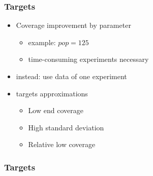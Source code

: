 \begin{frame}
	\frametitle{Targets}
	
	\begin{itemize}
		\item Coverage improvement by parameter
		\begin{itemize}
			\item example: $pop = 125$
			\item time-consuming experiments necessary
		\end{itemize} 
		\item instead: use data of one experiment
		\item targets approximations
		\begin{itemize}
			\item Low end coverage
			\item High standard deviation 
			\item Relative low coverage  
		\end{itemize} 
	\end{itemize}
	
\end{frame}

\begin{frame}
	\frametitle{Targets}
	
	\begin{table}
		\centering
		\resizebox{\textwidth}{!}{}
	\end{table}
	
\end{frame}